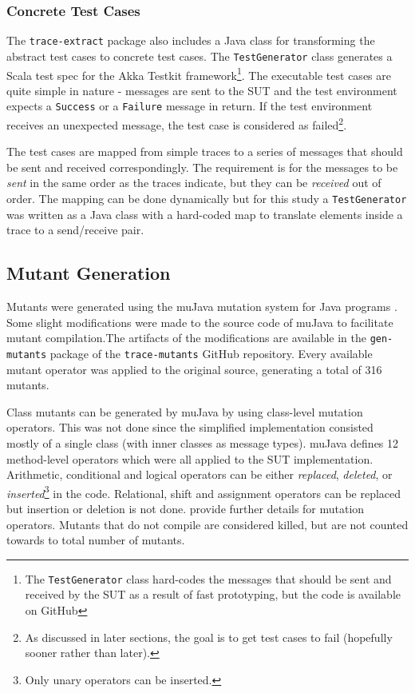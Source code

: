 \documentclass{article}
\begin{document}
			\subsubsection{Concrete Test Cases}
				\label{sec:method_concrete}
				The \texttt{trace-extract} package also includes a Java class for transforming the abstract test cases to concrete test cases. The \texttt{TestGenerator} class generates a Scala test spec for the Akka Testkit framework\footnote{The \texttt{TestGenerator} class hard-codes the messages that should be sent and received by the SUT as a result of fast prototyping, but the code is available on GitHub}. The executable test cases are quite simple in nature \-- messages are sent to the SUT and the test environment expects a \texttt{Success} or a \texttt{Failure} message in return. If the test environment receives an unexpected message, the test case is considered as failed\footnote{As discussed in later sections, the goal is to get test cases to fail (hopefully sooner rather than later).}.

				The test cases are mapped from simple traces to a series of messages that should be sent and received correspondingly. The requirement is for the messages to be \textit{sent} in the same order as the traces indicate, but they can be \textit{received} out of order. The mapping can be done dynamically but for this study a \texttt{TestGenerator} was written as a Java class with a hard-coded map to translate elements inside a trace to a send/receive pair.

		\subsection{Mutant Generation}
			\label{sec:method_mutgen}
			Mutants were generated using the muJava mutation system for Java programs \citep{mujava}. Some slight modifications were made to the source code of muJava to facilitate mutant compilation.The artifacts of the modifications are available in the \texttt{gen-mutants} package of the \texttt{trace-mutants} GitHub repository. Every available mutant operator was applied to the original source, generating a total of 316 mutants.

			Class mutants can be generated by muJava by using class-level mutation operators. This was not done since the simplified implementation consisted mostly of a single class (with inner classes as message types). muJava defines 12 method-level operators which were all applied to the SUT implementation. Arithmetic, conditional and logical operators can be either \textit{replaced}, \textit{deleted}, or \textit{inserted}\footnote{Only unary operators can be inserted.} in the code. Relational, shift and assignment operators can be replaced but insertion or deletion is not done. \citet{mutopsMethod} provide further details for mutation operators. Mutants that do not compile are considered killed, but are not counted towards to total number of mutants.
\end{document}

